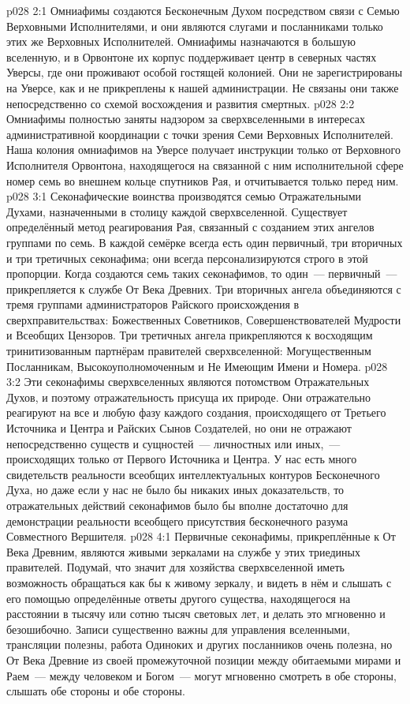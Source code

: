 \vs p028 2:1 Омниафимы создаются Бесконечным Духом посредством связи с Семью Верховными Исполнителями, и они являются слугами и посланниками только этих же Верховных Исполнителей. Омниафимы назначаются в большую вселенную, и в Орвонтоне их корпус поддерживает центр в северных частях Уверсы, где они проживают особой гостящей колонией. Они не зарегистрированы на Уверсе, как и не прикреплены к нашей администрации. Не связаны они также непосредственно со схемой восхождения и развития смертных.
\vs p028 2:2 Омниафимы полностью заняты надзором за сверхвселенными в интересах административной координации с точки зрения Семи Верховных Исполнителей. Наша колония омниафимов на Уверсе получает инструкции только от Верховного Исполнителя Орвонтона, находящегося на связанной с ним исполнительной сфере номер семь во внешнем кольце спутников Рая, и отчитывается только перед ним.
\vs p028 3:1 Секонафические воинства производятся семью Отражательными Духами, назначенными в столицу каждой сверхвселенной. Существует определённый метод реагирования Рая, связанный с созданием этих ангелов группами по семь. В каждой семёрке всегда есть один первичный, три вторичных и три третичных секонафима; они всегда персонализируются строго в этой пропорции. Когда создаются семь таких секонафимов, то один~--- первичный~--- прикрепляется к службе От Века Древних. Три вторичных ангела объединяются с тремя группами администраторов Райского происхождения в сверхправительствах: Божественных Советников, Совершенствователей Мудрости и Всеобщих Цензоров. Три третичных ангела прикрепляются к восходящим тринитизованным партнёрам правителей сверхвселенной: Могущественным Посланникам, Высокоуполномоченным и Не Имеющим Имени и Номера.
\vs p028 3:2 Эти секонафимы сверхвселенных являются потомством Отражательных Духов, и поэтому отражательность присуща их природе. Они отражательно реагируют на все и любую фазу каждого создания, происходящего от Третьего Источника и Центра и Райских Сынов Создателей, но они не отражают непосредственно существ и сущностей~--- личностных или иных,~--- происходящих только от Первого Источника и Центра. У нас есть много свидетельств реальности всеобщих интеллектуальных контуров Бесконечного Духа, но даже если у нас не было бы никаких иных доказательств, то отражательных действий секонафимов было бы вполне достаточно для демонстрации реальности всеобщего присутствия бесконечного разума Совместного Вершителя.
\vs p028 4:1 Первичные секонафимы, прикреплённые к От Века Древним, являются живыми зеркалами на службе у этих триединых правителей. Подумай, что значит для хозяйства сверхвселенной иметь возможность обращаться как бы к живому зеркалу, и видеть в нём и слышать с его помощью определённые ответы другого существа, находящегося на расстоянии в тысячу или сотню тысяч световых лет, и делать это мгновенно и безошибочно. Записи существенно важны для управления вселенными, трансляции полезны, работа Одиноких и других посланников очень полезна, но От Века Древние из своей промежуточной позиции между обитаемыми мирами и Раем~--- между человеком и Богом~--- могут мгновенно смотреть в обе стороны, слышать обе стороны и  обе стороны.
